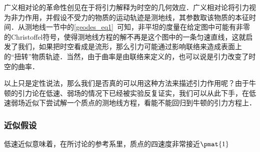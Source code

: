 

广义相对论的革命性创见在于将引力解释为时空的几何效应．广义相对论将引力视为非力作用，并假设不受力的物质的运动轨迹是测地线，其参数取该物质的本征时间．从测地线一节中的\autoref{geodes_eq1}~可知，非平坦的度量在给定图中可能有非零的Christoffel符号，使得测地线方程的解不再是这个图中的一条匀速直线，这就启发了我们，如果把时空看成是流形，那么引力可能通过影响联络来造成表面上的“扭转”物质轨迹．当然，由于曲率是由联络来定义的，也可以说是引力改变了时空的曲率．

以上只是定性说法，那么我们是否真的可以用这种方法来描述引力作用呢？由于牛顿的引力论在低速、弱场的情况下已经被实验反复证实，我们可以从此下手，在低速弱场近似下尝试解一个质点的测地线方程，看能不能回归到牛顿的引力方程上．

\subsubsection{近似假设}

低速近似意味着，在所讨论的参考系里，质点的四速度非常接近$\pmat{1}$
























